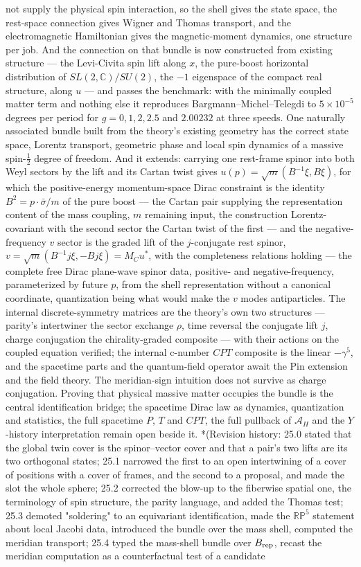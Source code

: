 not supply the physical spin interaction, so the shell gives the state space, the rest-space connection gives Wigner and Thomas transport, and the electromagnetic Hamiltonian gives the magnetic-moment dynamics, one structure per job. And the connection on that bundle is now constructed from existing structure — the Levi-Civita spin lift along $x$, the pure-boost horizontal distribution of $SL(2,\mathbb C)/SU(2)$, the $-1$ eigenspace of the compact real structure, along $u$ — and passes the benchmark: with the minimally coupled matter term and nothing else it reproduces Bargmann–Michel–Telegdi to $5\times10^{-5}$ degrees per period for $g = 0, 1, 2, 2.5$ and $2.00232$ at three speeds. One naturally associated bundle built from the theory's existing geometry has the correct state space, Lorentz transport, geometric phase and local spin dynamics of a massive spin-$\tfrac12$ degree of freedom. And it extends: carrying one rest-frame spinor into both Weyl sectors by the lift and its Cartan twist gives $u(p) = \sqrt m(B^{-1}\xi,B\xi)$, for which the positive-energy momentum-space Dirac constraint is the identity $B^2 = p\cdot\bar\sigma/m$ of the pure boost — the Cartan pair supplying the representation content of the mass coupling, $m$ remaining input, the construction Lorentz-covariant with the second sector the Cartan twist of the first — and the negative-frequency $v$ sector is the graded lift of the $j$-conjugate rest spinor, $v = \sqrt m(B^{-1}j\xi,-Bj\xi) = M_Cu^*$, with the completeness relations holding — the complete free Dirac plane-wave spinor data, positive- and negative-frequency, parameterized by future $p$, from the shell representation without a canonical coordinate, quantization being what would make the $v$ modes antiparticles. The internal discrete-symmetry matrices are the theory's own two structures — parity's intertwiner the sector exchange $\rho$, time reversal the conjugate lift $j$, charge conjugation the chirality-graded composite — with their actions on the coupled equation verified; the internal c-number $CPT$ composite is the linear $-\gamma^5$, and the spacetime parts and the quantum-field operator await the Pin extension and the field theory. The meridian-sign intuition does not survive as charge conjugation. Proving that physical massive matter occupies the bundle is the central identification bridge; the spacetime Dirac law as dynamics, quantization and statistics, the full spacetime $P$, $T$ and $CPT$, the full pullback of $\mathcal A_H$ and the $Y$-history interpretation remain open beside it. *(Revision history: 25.0 stated that the global twin cover is the spinor–vector cover and that a pair's two lifts are its two orthogonal states; 25.1 narrowed the first to an open intertwining of a cover of positions with a cover of frames, and the second to a proposal, and made the slot the whole sphere; 25.2 corrected the blow-up to the fiberwise spatial one, the terminology of spin structure, the parity language, and added the Thomas test; 25.3 demoted "soldering" to an equivariant identification, made the $\mathbb{RP}^5$ statement about local Jacobi data, introduced the bundle over the mass shell, computed the meridian transport; 25.4 typed the mass-shell bundle over $B_{\rm rep}$, recast the meridian computation as a counterfactual test of a candidate 